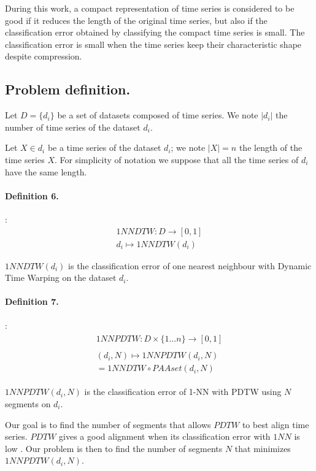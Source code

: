 During this work, a compact representation of time series  is considered to be good
if it reduces the length of the original time series, but also if the classification error
obtained by classifying the compact time series is small. The classification error is small
when the time series keep their characteristic shape despite compression.   



\subsection{Problem definition.}

Let $D = \{d_i\}$ be a set of datasets composed of time series. We note
$|d_i|$ the number of time series of the dataset $d_i$.

Let $X \in d_i$ be a time series of the dataset $d_i$; we note $|X| = n$ the length of the time series $X$. For simplicity of notation we suppose that all the time series of $d_i$ have the same length.

\paragraph{Definition 6.}:
\begin{eqnarray}
 1NNDTW: D \rightarrow [0, 1] \\
  d_i\mapsto 1NNDTW(d_i)
\end{eqnarray}


 $1NNDTW(d_i)$ is the classification error of one nearest neighbour with Dynamic Time Warping on the dataset $d_i$.





\paragraph{Definition 7.}:
\begin{eqnarray}
\begin{array}{l}
 1NNPDTW: D\times\{1 \ldots n\}\rightarrow [0, 1]\\
 \\
(d_i, N)\mapsto 1NNPDTW(d_i, N) \\
 =  1NNDTW \circ PAAset ( d_i, N) 
\end{array}
\end{eqnarray}

$1NNPDTW( d_i, N)$  is the classification error of 1-NN with PDTW using $N$ segments on 
 $d_i$.


Our goal is to find the number of segments that allows $PDTW$ to best align
time series.  $PDTW$ gives a good alignment when its
classification error with $1NN$ is low
\cite{Rakthanmanon_Campana_Mueen_Batista_Westover_Zhu_Zakaria_Keogh_2012}.  Our
problem is then to find the number of segments $N$ that minimizes $1NNPDTW(d_i,
N)$.

